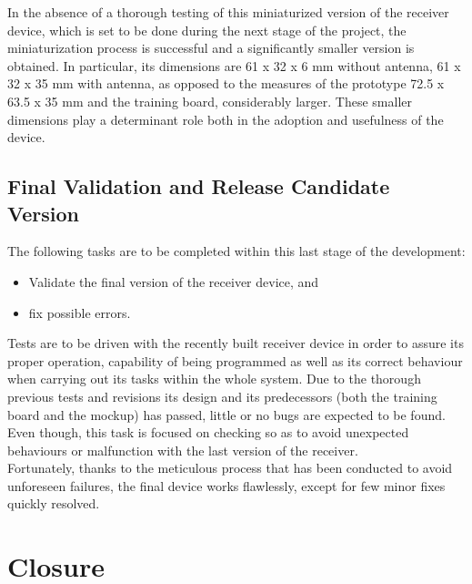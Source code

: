 			In the absence of a thorough testing of this miniaturized version of the receiver device, which is set
			to be done during the next stage of the project, the miniaturization process is successful and a significantly
			smaller version is obtained. In particular, its dimensions are 61 x 32 x 6 mm without antenna, 61 x 32 x 35 mm
			with antenna, as opposed to the measures of the prototype 72.5 x 63.5 x 35 mm and the training board, considerably
			larger. These smaller dimensions play a determinant role both in the adoption and usefulness of the device.\\%

		\subsection{Final Validation and Release Candidate Version}
			The following tasks are to be completed within this last stage of the development:

			\begin{itemize}
				\item Validate the final version of the receiver device, and
				\item fix possible errors.
			\end{itemize}

			Tests are to be driven with the recently built receiver device in order to assure its
			proper operation, capability of being programmed as well as its correct behaviour when
			carrying out its tasks within the whole system. Due to the thorough previous tests and
			revisions its design and its predecessors (both the training board and the mockup) has
			passed, little or no bugs are expected to be found. Even though, this task is focused 
			on checking so as to avoid unexpected behaviours or malfunction with the last version
			of the receiver.\\

			Fortunately, thanks to the meticulous process that has been conducted to avoid unforeseen
			failures, the final device works flawlessly, except for few minor fixes quickly resolved.\\
		
		\section{Closure}
		\label{sec:hw-final}

